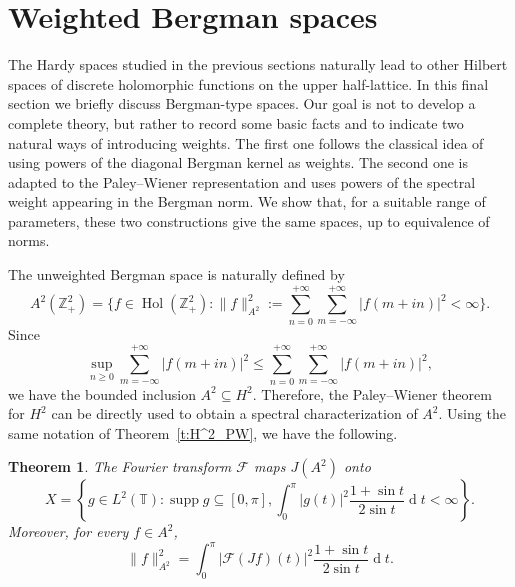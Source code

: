 \documentclass[12pt,a4paper,reqno]{amsart}
\DeclareMathOperator*{\supp}{supp}
\newtheorem{thm}{Theorem}[section]
\theoremstyle{definition}
\theoremstyle{definition}\newtheorem{defn}[thm]{Definition}
\begin{document}
    \section{Weighted Bergman spaces}\label{s:Bergman}
    The Hardy spaces studied in the previous sections naturally lead to other Hilbert spaces of discrete holomorphic functions on the upper half-lattice. In this final section we briefly discuss Bergman-type spaces. Our goal is not to develop a complete theory, but rather to record some basic facts and to indicate two natural ways of introducing weights. The first one follows the classical idea of using powers of the diagonal Bergman kernel as weights. The second one is adapted to the Paley--Wiener representation and uses powers of the spectral weight appearing in the Bergman norm. We show that, for a suitable range of parameters, these two constructions give the same spaces, up to equivalence of norms.
    
    The unweighted Bergman space is naturally defined by
    \[
    A^2(\mathbb{Z}^2_+)
    =
    \Big\{
    f\in \operatorname{Hol}(\mathbb Z^2_+):
    \|f\|_{A^2}^2
    :=
    \sum_{n=0}^{+\infty}
    \sum_{m=-\infty}^{+\infty}
    |f(m+in)|^2
    <\infty
    \Big\}.
    \]
    Since
    \[
    \sup_{n\geqslant 0}
    \sum_{m=-\infty}^{+\infty}|f(m+in)|^2
    \leqslant
    \sum_{n=0}^{+\infty}
    \sum_{m=-\infty}^{+\infty}
    |f(m+in)|^2,
    \]
    we have the bounded inclusion
    $A^2\subseteq H^2$.
    Therefore, the Paley--Wiener theorem for $H^2$ can be directly used to obtain a
    spectral characterization of $A^2$. 
    Using the same notation of Theorem~\ref{t:H^2_PW}, we have the following.
    \begin{thm}\label{t:B^2_PW}
    The Fourier transform $\mathcal F$ maps $J(A^2)$ onto
    \[
    X=\left\{g\in L^2(\mathbb T): \supp g\subseteq [0,\pi], \int_0^\pi|g(t)|^2\frac{1+\sin t}{2\sin t}\operatorname{d}\! t<\infty\right\}.
    \]
    Moreover, for every $f\in A^2$,
    \[
    \|f\|_{A^2}^2=\int_{0}^{\pi}|\mathcal F(Jf)(t)|^2\frac{1+\sin t}{2\sin t}\operatorname{d}\!t.
    \]
    \end{thm}
    
\end{document}
